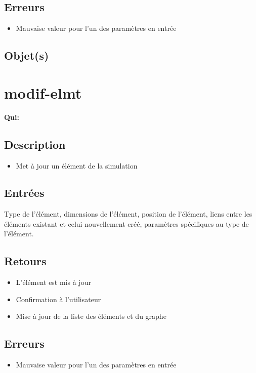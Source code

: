 	\subsection{Erreurs}
	\begin{itemize}
		\item Mauvaise valeur pour l'un des paramètres en entrée \fatal
	\end{itemize}

	\subsection{Objet(s)}
		\allobjs

\section{modif-elmt}
	\textbf{Qui:} \urt

	\subsection{Description}
	\begin{itemize}
		\item Met à jour un élément de la simulation
	\end{itemize}

	\subsection{Entrées}
		Type de l'élément, dimensions de l'élément, position de l'élément, liens entre les éléments existant et celui
		nouvellement créé, paramètres spécifiques au type de l'élément.

	\subsection{Retours}
	\begin{itemize}
		\item L'élément est mis à jour
		\item Confirmation à l'utilisateur
		\item Mise à jour de la liste des éléments et du graphe
	\end{itemize}

	\subsection{Erreurs}
	\begin{itemize}
		\item Mauvaise valeur pour l'un des paramètres en entrée \fatal
	\end{itemize}

